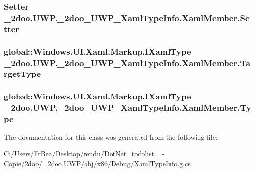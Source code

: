 \hypertarget{class__2doo_1_1_u_w_p_1_1__2doo___u_w_p___xaml_type_info_1_1_xaml_member_22d470148fbb89c6814f4316a390e032}{
\subsubsection[{Setter}]{\setlength{\rightskip}{0pt plus 5cm}Setter \_\-2doo.UWP.\_\-2doo\_\-UWP\_\-XamlTypeInfo.XamlMember.Setter}}
\label{class__2doo_1_1_u_w_p_1_1__2doo___u_w_p___xaml_type_info_1_1_xaml_member_22d470148fbb89c6814f4316a390e032}


\hypertarget{class__2doo_1_1_u_w_p_1_1__2doo___u_w_p___xaml_type_info_1_1_xaml_member_ea0e2346b971d7a0879f886cba222167}{
\subsubsection[{TargetType}]{\setlength{\rightskip}{0pt plus 5cm}global::Windows.UI.Xaml.Markup.IXamlType \_\-2doo.UWP.\_\-2doo\_\-UWP\_\-XamlTypeInfo.XamlMember.TargetType}}
\label{class__2doo_1_1_u_w_p_1_1__2doo___u_w_p___xaml_type_info_1_1_xaml_member_ea0e2346b971d7a0879f886cba222167}


\hypertarget{class__2doo_1_1_u_w_p_1_1__2doo___u_w_p___xaml_type_info_1_1_xaml_member_b5b524c79b0417219269736767df1e7c}{
\subsubsection[{Type}]{\setlength{\rightskip}{0pt plus 5cm}global::Windows.UI.Xaml.Markup.IXamlType \_\-2doo.UWP.\_\-2doo\_\-UWP\_\-XamlTypeInfo.XamlMember.Type}}
\label{class__2doo_1_1_u_w_p_1_1__2doo___u_w_p___xaml_type_info_1_1_xaml_member_b5b524c79b0417219269736767df1e7c}




The documentation for this class was generated from the following file:\begin{CompactItemize}
\item 
C:/Users/FrBea/Desktop/rendu/DotNet\_\-todolist\_ - Copie/2doo/\_\-2doo.UWP/obj/x86/Debug/\hyperlink{_xaml_type_info_8g_8cs}{XamlTypeInfo.g.cs}\end{CompactItemize}
